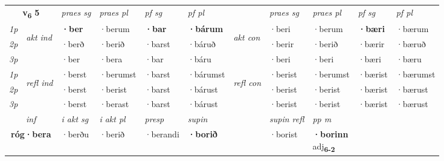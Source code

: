 \noindent
\begin{tabular}{lllllllllll} \toprule
\multicolumn{2}{c}{\textbf{v{\textsubscript{6}}} \Large{\textbf{5}}}  &  \textit{praes sg}  & \textit{praes pl}  &\textit{ pf sg} & \textit{pf pl} &  &  \textit{praes sg}  & \textit{praes pl}  & \textit{pf sg} & \textit{pf pl } \\*
	\cmidrule{3-6} \cmidrule{8-11}
 {\textit{1p}} & \multirow{3}{*}{\begin{turn}{90}\textit{akt ind}\end{turn}} & \textbf{·ber} & ·berum & \textbf{·bar} & \textbf{·bárum} & \multirow{3}{*}{\begin{turn}{90}\textit{akt con}\end{turn}} &·beri & ·berum & \textbf{·bæri} & ·bærum\\*
 {\textit{2p}} &  &  ·berð  & ·berið & ·barst & ·báruð & & ·berir & ·berið & ·bærir & ·bæruð \\*
{\textit{3p}} &  & ·ber & ·bera & ·bar & ·báru & & ·beri & ·beri& ·bæri & ·bæru \\*
\cmidrule{3-6} \cmidrule{8-11}
 {\textit{1p}} & \multirow{3}{*}{\begin{turn}{90}\textit{refl ind}\end{turn}}  & ·berst & ·berumst & ·barst & ·bárumst & \multirow{3}{*}{\begin{turn}{90}\textit{refl con}\end{turn}}  &·berist & ·berumst & ·bærist & ·bærumst \\*
 {\textit{2p}} &  & ·berst & ·berist & ·barst & ·bárust & &·berist & ·berist & ·bærist & ·bærust \\*
 {\textit{3p}}  & & ·berst & ·berast & ·barst & ·bárust & & ·berist & ·berist& ·bærist & ·bærust \\*
\cmidrule{3-6} \cmidrule{8-11}

   \multicolumn{2}{c}{\textit{inf}}  & \textit{i akt sg} & \textit{i akt pl}   & \textit{presp} & \textit{supin} && \textit{supin refl} & \textit{pp m} \\*
  \multicolumn{2}{c}{\textbf{róg\allowbreak ·bera}} & ·berðu  & ·berið   & ·berandi &  \textbf{·borið} && ·borist & \specialcell{\textbf{·borinn} \\ adj\textbf{\textsubscript{6-2}}} \\*
\end{tabular}

